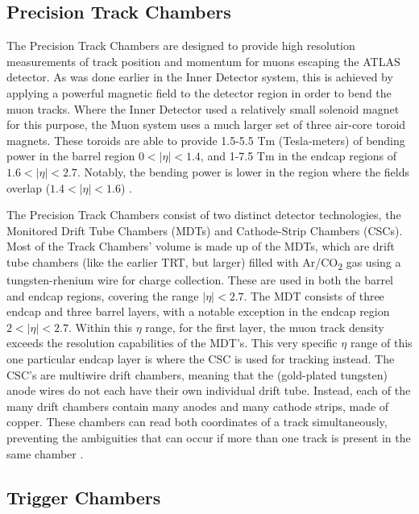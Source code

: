     \subsection{Precision Track Chambers}

        The Precision Track Chambers are designed to provide high resolution measurements of track position and momentum for muons escaping the ATLAS detector. 
        As was done earlier in the Inner Detector system, this is achieved by applying a powerful magnetic field to the detector region in order to bend the muon tracks.
        Where the Inner Detector used a relatively small solenoid magnet for this purpose, the Muon system uses a much larger set of three air-core toroid magnets.
        These toroids are able to provide 1.5-5.5 Tm (Tesla-meters) of bending power in the barrel region $0<|\eta|<1.4$, and 1-7.5 Tm in the endcap regions of $1.6<|\eta|<2.7$.
        Notably, the bending power is lower in the region where the fields overlap ($1.4<|\eta|<1.6$) \cite{atlas_tdr}.

        The Precision Track Chambers consist of two distinct detector technologies, the Monitored Drift Tube Chambers (MDTs) and Cathode-Strip Chambers (CSCs).
        Most of the Track Chambers' volume is made up of the MDTs, which are drift tube chambers (like the earlier TRT, but larger) filled with Ar/CO\textsubscript{2} gas using a tungsten-rhenium wire for charge collection.
        These are used in both the barrel and endcap regions, covering the range $|\eta| < 2.7$.
        The MDT consists of three endcap and three barrel layers, with a notable exception in the endcap region $2 < |\eta| < 2.7$.
        Within this $\eta$ range, for the first layer, the muon track density exceeds the resolution capabilities of the MDT's.
        This very specific $\eta$ range of this one particular endcap layer is where the CSC is used for tracking instead.
        The CSC's are multiwire drift chambers, meaning that the (gold-plated tungsten) anode wires do not each have their own individual drift tube.
        Instead, each of the many drift chambers contain many anodes and many cathode strips, made of copper.
        These chambers can read both coordinates of a track simultaneously, preventing the ambiguities that can occur if more than one track is present in the same chamber \cite{atlas_tdr}.

    \subsection{Trigger Chambers}\label{sec:muon-trigger_chamber}

